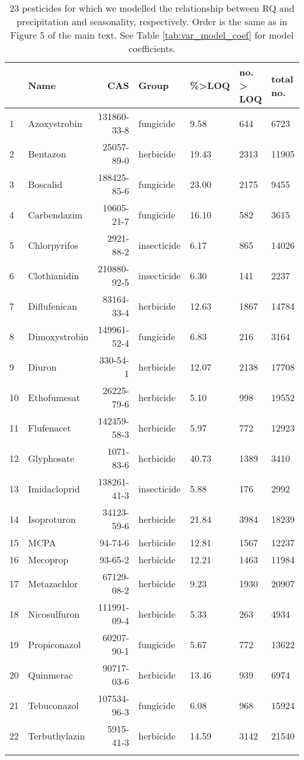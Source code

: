 \begin{longtable}{lp{2.5cm}rlp{1.5cm}p{2cm}p{2cm}}
\caption[23 pesticides for which we modelled the relationship with precipitation and seasonality.]{23 pesticides for which we modelled the relationship between RQ and precipitation and seasonality, respectively.
                    Order is the same as in Figure 5 of the main text. See Table \ref{tab:var_model_coef} for model coefficients.} \\ 
  \toprule
 & Name & CAS & Group & \%>LOQ & no. > LOQ & total no. \\ 
  \midrule
1 & Azoxystrobin & 131860-33-8 & fungicide & 9.58 & 644 & 6723 \\ 
  2 & Bentazon & 25057-89-0 & herbicide & 19.43 & 2313 & 11905 \\ 
  3 & Boscalid & 188425-85-6 & fungicide & 23.00 & 2175 & 9455 \\ 
  4 & Carbendazim & 10605-21-7 & fungicide & 16.10 & 582 & 3615 \\ 
  5 & Chlorpyrifos & 2921-88-2 & insecticide & 6.17 & 865 & 14026 \\ 
  6 & Clothianidin & 210880-92-5 & insecticide & 6.30 & 141 & 2237 \\ 
  7 & Diflufenican & 83164-33-4 & herbicide & 12.63 & 1867 & 14784 \\ 
  8 & Dimoxystrobin & 149961-52-4 & fungicide & 6.83 & 216 & 3164 \\ 
  9 & Diuron & 330-54-1 & herbicide & 12.07 & 2138 & 17708 \\ 
  10 & Ethofumesat & 26225-79-6 & herbicide & 5.10 & 998 & 19552 \\ 
  11 & Flufenacet & 142459-58-3 & herbicide & 5.97 & 772 & 12923 \\ 
  12 & Glyphosate & 1071-83-6 & herbicide & 40.73 & 1389 & 3410 \\ 
  13 & Imidacloprid & 138261-41-3 & insecticide & 5.88 & 176 & 2992 \\ 
  14 & Isoproturon & 34123-59-6 & herbicide & 21.84 & 3984 & 18239 \\ 
  15 & MCPA & 94-74-6 & herbicide & 12.81 & 1567 & 12237 \\ 
  16 & Mecoprop & 93-65-2 & herbicide & 12.21 & 1463 & 11984 \\ 
  17 & Metazachlor & 67129-08-2 & herbicide & 9.23 & 1930 & 20907 \\ 
  18 & Nicosulfuron & 111991-09-4 & herbicide & 5.33 & 263 & 4934 \\ 
  19 & Propiconazol & 60207-90-1 & fungicide & 5.67 & 772 & 13622 \\ 
  20 & Quinmerac & 90717-03-6 & herbicide & 13.46 & 939 & 6974 \\ 
  21 & Tebuconazol & 107534-96-3 & fungicide & 6.08 & 968 & 15924 \\ 
  22 & Terbuthylazin & 5915-41-3 & herbicide & 14.59 & 3142 & 21540 \\ 
   \bottomrule
\label{tab:var_model}
\end{longtable}
